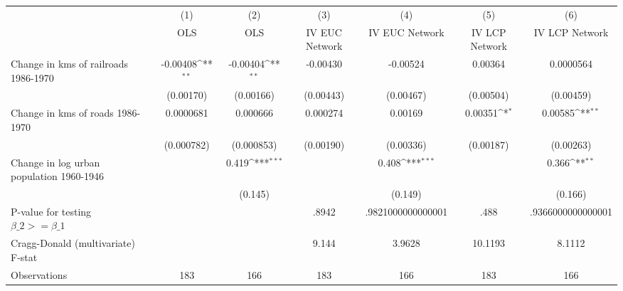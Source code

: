 {
\def\sym#1{\ifmmode^{#1}\else\(^{#1}\)\fi}
\begin{tabular}{l*{6}{c}}
\hline\hline
                &\multicolumn{1}{c}{(1)}&\multicolumn{1}{c}{(2)}&\multicolumn{1}{c}{(3)}&\multicolumn{1}{c}{(4)}&\multicolumn{1}{c}{(5)}&\multicolumn{1}{c}{(6)}\\
                &\multicolumn{1}{c}{OLS}&\multicolumn{1}{c}{OLS}&\multicolumn{1}{c}{IV EUC Network}&\multicolumn{1}{c}{IV EUC Network}&\multicolumn{1}{c}{IV LCP Network}&\multicolumn{1}{c}{IV LCP Network}\\
\hline
Change in kms of railroads 1986-1970& -0.00408\sym{**} & -0.00404\sym{**} & -0.00430         & -0.00524         &  0.00364         &0.0000564         \\
                &(0.00170)         &(0.00166)         &(0.00443)         &(0.00467)         &(0.00504)         &(0.00459)         \\
[1em]
Change in kms of roads 1986-1970&0.0000681         & 0.000666         & 0.000274         &  0.00169         &  0.00351\sym{*}  &  0.00585\sym{**} \\
                &(0.000782)         &(0.000853)         &(0.00190)         &(0.00336)         &(0.00187)         &(0.00263)         \\
[1em]
Change in log urban population 1960-1946&                  &    0.419\sym{***}&                  &    0.408\sym{***}&                  &    0.366\sym{**} \\
                &                  &  (0.145)         &                  &  (0.149)         &                  &  (0.166)         \\
\hline
P-value for testing $\beta\_{2} >= \beta\_{1}$&                  &                  &    .8942         &.9821000000000001         &     .488         &.9366000000000001         \\
Cragg-Donald (multivariate) F-stat&                  &                  &    9.144         &   3.9628         &  10.1193         &   8.1112         \\
Observations    &      183         &      166         &      183         &      166         &      183         &      166         \\
\hline\hline
\end{tabular}
}
